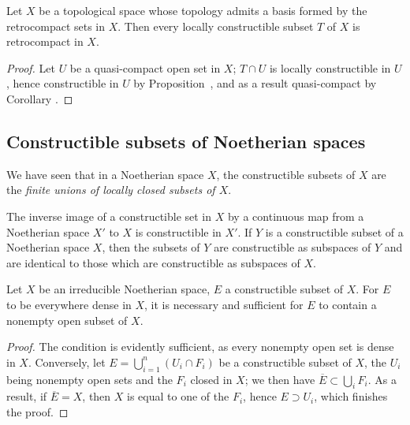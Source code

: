 \begin{corollary}[9.1.13]
\label{0.9.1.13}
Let $X$ be a topological space whose topology admits a basis formed by the retrocompact sets in $X$.
Then every locally constructible subset $T$ of $X$ is retrocompact in $X$.
\end{corollary}

\begin{proof}
Let $U$ be a quasi-compact open set in $X$; $T\cap U$ is locally constructible in $U$, hence constructible in $U$ by Proposition~, and as a result quasi-compact by Corollary .
\end{proof}

\subsection{Constructible subsets of Noetherian spaces}
\label{subsection:0.9.2}

\begin{env}[9.2.1]
\label{0.9.2.1}
We have seen  that in a Noetherian space $X$, the constructible subsets of $X$ are the \emph{finite unions of locally closed subsets of $X$}.

The inverse image of a constructible set in $X$ by a continuous map from a Noetherian space $X'$ to $X$ is constructible in $X'$.
If $Y$ is a constructible subset of a Noetherian space $X$, then the subsets of $Y$ are constructible as subspaces of $Y$ and are identical to those which are constructible as subspaces of $X$.
\end{env}

\begin{proposition}[9.2.2]
\label{0.9.2.2}
Let $X$ be an irreducible Noetherian space, $E$ a constructible subset of $X$.
For $E$ to be everywhere dense in $X$, it is necessary and sufficient for $E$ to contain a nonempty open subset of $X$.
\end{proposition}

\begin{proof}
The condition is evidently sufficient, as every nonempty open set is dense in $X$.
Conversely, let $E=\bigcup_{i=1}^n(U_i\cap F_i)$ be a constructible subset of $X$, the $U_i$ being nonempty open sets and the $F_i$ closed in $X$; we then have $\overline{E}\subset\bigcup_i F_i$.
As a result, if $\overline{E}=X$, then $X$ is equal to one of the $F_i$, hence $E\supset U_i$, which finishes the proof.
\end{proof}

